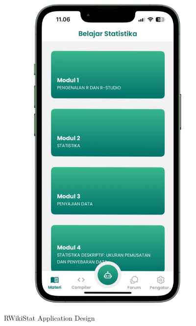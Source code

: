 \documentclass[conference,a4paper]{IEEEtran}
\begin{document}
\begin{enumerate}
\begin{figure}[H]
\begin{subfigure}{0.49\linewidth}
            \centering
            \includegraphics[width=\linewidth]{images/modul.png}
          \end{subfigure}
          \caption{RWikiStat Application Design}
          \label{fig:design}
        \end{figure}



\end{enumerate}
\end{document}
